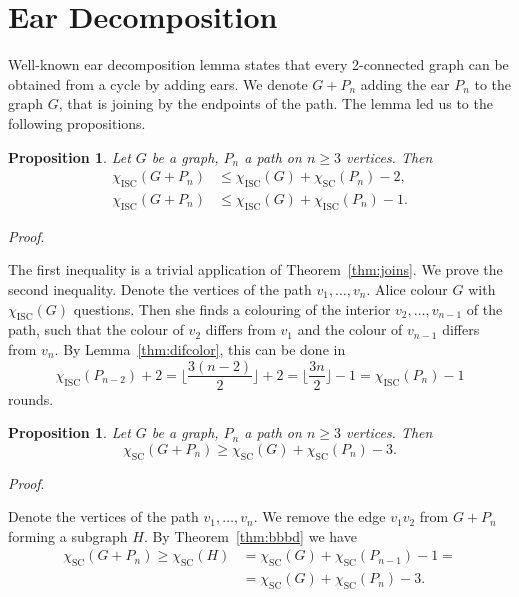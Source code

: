\documentclass[11pt,a4paper]{article}
\theoremstyle{plain}
\newtheorem{prop}[thm]{Proposition}
\newenvironment{pf}{
  \par\medskip\noindent
  \textit{Proof}.
}{
\newline
\rightline{$\square$}  %
}
\theoremstyle{definition}
\theoremstyle{remark}
\newcommand{\scn}{\chi_\text{SC}}
\newcommand{\iscn}{\chi_\text{ISC}}
\begin{document}
\section{Ear Decomposition}

Well-known ear decomposition lemma states that every 2-connected graph can be obtained from a cycle by adding ears. We denote $G+P_n$ adding the ear $P_n$ to the graph $G$, that is joining by the endpoints of the path. The lemma led us to the following propositions.

\begin{prop}
Let $G$ be a graph, $P_n$ a path on $n\geq 3$ vertices. Then 
\begin{align*}
\iscn(G+P_n) &\leq \iscn(G)+\scn(P_n)-2, \\
\iscn(G+P_n) &\leq \iscn(G)+\iscn(P_n)-1.
\end{align*}
\end{prop}

\begin{pf}
The first inequality is a trivial application of Theorem~\ref{thm:joins}. We prove the second inequality. Denote the vertices of the path $v_1, \ldots, v_n$. Alice colour $G$ with $\iscn(G)$ questions. Then she finds a colouring of the interior $v_2, \ldots, v_{n-1}$ of the path, such that the colour of $v_2$ differs from $v_1$ and the colour of $v_{n-1}$ differs from $v_n$. By Lemma~\ref{thm:difcolor}, this can be done in $$\iscn(P_{n-2})+2 = \lfloor{\frac{3(n-2)}{2}}\rfloor+2 = \lfloor{\frac{3n}{2}}\rfloor-1 = \iscn(P_n)-1$$ rounds.
\end{pf}

\begin{prop}
Let $G$ be a graph, $P_n$ a path on $n\geq 3$ vertices. Then 
$$\scn(G+P_n) \geq \scn(G)+\scn(P_n)-3.$$
\end{prop}

\begin{pf}
Denote the vertices of the path $v_1, \ldots, v_n$. We remove the edge $v_1v_2$ from $G+P_n$ forming a subgraph $H$. By Theorem~\ref{thm:bbbd} we have 
\begin{align*}
\scn(G+P_n) \geq \scn(H) &= \scn(G) + \scn(P_{n-1}) - 1 = \\
 &= \scn(G)+\scn(P_n)-3.
\end{align*}
\end{pf}
\end{document}
